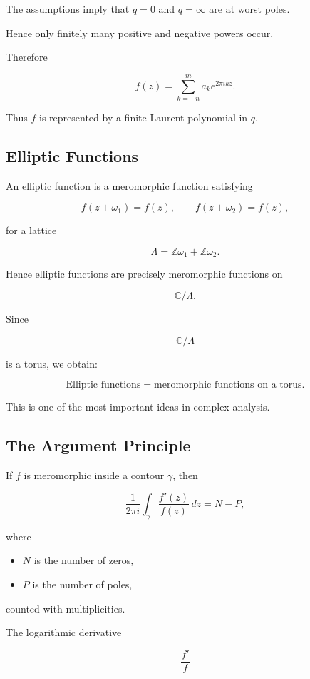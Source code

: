 \documentclass[12pt,a4paper]{article}
\theoremstyle{notespace}
\begin{document}
The assumptions imply that \(q=0\) and \(q=\infty\) are at worst poles.

Hence only finitely many positive and negative powers occur.

Therefore

\[
f(z)
=
\sum_{k=-n}^{m}
a_k e^{2\pi ikz}.
\]

Thus \(f\) is represented by a finite Laurent polynomial in \(q\).

\subsection{Elliptic Functions}

An elliptic function is a meromorphic function satisfying

\[
f(z+\omega_1)=f(z),
\qquad
f(z+\omega_2)=f(z),
\]

for a lattice

\[
\Lambda
=
\mathbb Z\omega_1
+
\mathbb Z\omega_2.
\]

Hence elliptic functions are precisely meromorphic functions on

\[
\mathbb C/\Lambda.
\]

Since

\[
\mathbb C/\Lambda
\]

is a torus, we obtain:

\[
\boxed{
	\text{Elliptic functions}
	=
	\text{meromorphic functions on a torus}.
}
\]

This is one of the most important ideas in complex analysis.

\subsection{The Argument Principle}

If \(f\) is meromorphic inside a contour \(\gamma\), then

\[
\frac{1}{2\pi i}
\int_{\gamma}
\frac{f'(z)}{f(z)}
\,dz
=
N-P,
\]

where

\begin{itemize}
	\item \(N\) is the number of zeros,
	\item \(P\) is the number of poles,
\end{itemize}

counted with multiplicities.

The logarithmic derivative

\[
\frac{f'}{f}
\]
\end{document}
